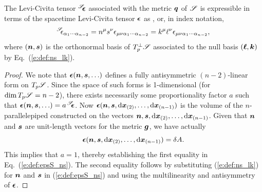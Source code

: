 \begin{prop}
The Levi-Civita tensor ${}^{\mathscr{S}}\!\!\bm{\epsilon}$ associated with the metric $\bm{q}$ of $\mathscr{S}$
is expressible in terms of the spacetime Levi-Civita tensor
$\bm{\epsilon}$ as
\be \label{e:def:epsS_ns}
    ,
\ee
or, in index notation,
\[
    {}^{\mathscr{S}}\!\!\epsilon_{\alpha_1\cdots\alpha_{n-2}} = n^\mu s^\nu \epsilon_{\mu\nu\alpha_1\cdots\alpha_{n-2}}
    = k^\mu \ell^\nu \epsilon_{\mu\nu\alpha_1\cdots\alpha_{n-2}} ,
\]
where $(\bm{n},\bm{s})$ is the orthonormal basis of $T_p^\perp\mathscr{S}$ associated to the
null basis $(\bm{\ell}, \bm{k})$ by Eq.~(\ref{e:def:ns_lk}).
\end{prop}

\begin{proof}
We note that $\bm{\epsilon}(\bm{n},\bm{s},\ldots)$
defines a fully antisymmetric $(n-2)$-linear form on $T_p\mathscr{S}$. Since the space
of such forms is 1-dimensional (for $\dim T_p\mathscr{S} = n-2$), there exists necessarily
some proportionality factor $a$ such that
$\bm{\epsilon}(\bm{n},\bm{s},\ldots) = a \, {}^{\mathscr{S}}\!\!\bm{\epsilon}$. Now
$\bm{\epsilon}(\bm{n},\bm{s},\mathrm{d}\bm{x}_{(2)},\ldots,\mathrm{d}\bm{x}_{(n-1)})$ is the volume
of the $n$-parallelepiped constructed on the vectors $\bm{n},\bm{s},\mathrm{d}\bm{x}_{(2)},\ldots,\mathrm{d}\bm{x}_{(n-1)}$.
Given that $\bm{n}$ and $\bm{s}$ are unit-length vectors for the metric $\bm{g}$,
we have actually
\[
    \bm{\epsilon}(\bm{n},\bm{s},\mathrm{d}\bm{x}_{(2)},\ldots,\mathrm{d}\bm{x}_{(n-1)}) = \delta A.
\]
This implies that $a=1$, thereby establishing the first equality
in Eq.~(\ref{e:def:epsS_ns}). The second equality follows by substituting (\ref{e:def:ns_lk})
for $\bm{n}$ and $\bm{s}$ in (\ref{e:def:epsS_ns}) and using the multilinearity
and antisymmetry of $\bm{\epsilon}$.
\end{proof}

